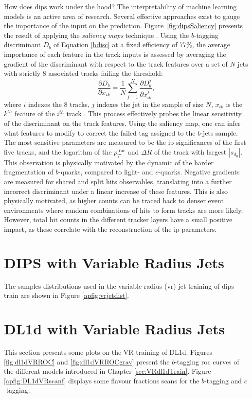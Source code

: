 How does \gls{dips} work under the hood? The interpretability of machine learning models is an active area of research. Several effective approaches exist to gauge the importance of the input on the prediction. Figure~\ref{fig:dipsSaliency} presents the result of applying the \textit{saliency maps} technique \cite{Simonyan2013DeepIC}. Using the $b$-tagging discriminant $D_b$ of Equation \ref{bdisc} at a fixed efficiency of 77\%, the average importance of each feature in the track inputs is assessed by averaging the gradient of the discriminant with respect to the track features over a set of $N$ jets with strictly 8 associated tracks failing the threshold:
\begin{equation}
  \frac{\partial D_b}{\partial x_{ik}} = \frac{1}{N} \sum_{j=1}^N \frac{\partial D_b^{j}}{\partial x_{ik}^{j}},
\end{equation} 
where $i$ indexes the 8 tracks, $j$ indexes the jet in the sample of size $N$, $x_{ik}$ is the $k^{th}$ feature of the $i^{th}$ track \cite{ATL-PHYS-PUB-2020-014}. This process effectively probes the linear sensitivity of the discriminant on the track features. Using the saliency map, one can infer what features to modify to correct the failed tag assigned to the $b$-jets sample. The most sensitive parameters are measured to be the \gls{ip} significances of the first five tracks, and the logarithm of the $p_T^{\textrm{frac}}$ and $\Delta R$ of the track with largest $|s_{d_0}|$. This observation is physically motivated by the dynamic of the harder fragmentation of $b$-quarks, compared to light- and $c$-quarks. Negative gradients are measured for shared and split hits observables, translating into a further incorrect discriminant under a linear increase of these features. This is also physically motivated, as higher counts can be traced back to denser event environments where random combinations of hits to form tracks are more likely. However, total hit counts in the different tracker layers have a small positive impact, as these correlate with the reconstruction of the \gls{ip} parameters.

\section{DIPS with Variable Radius Jets}\label{ap-DIPSVR}
The samples distributions used in the variable radius (\gls{vr}) jet training of \gls{dips} train are shown in Figure \ref{apfig:vrjetdist}.

\section{DL1d with Variable Radius Jets}\label{ap-DL1dVR}
This section presents some plots on the VR-training of DL1d. Figures \ref{fig:dl1dVRROC} and \ref{fig:dl1dVRROCgrav} present the $b$-tagging \gls{roc} curves of the different models introduced in Chapter \ref{sec:VRdl1dTrain}. Figure \ref{apfig:DL1dVRscanf} displays some flavour fractions scans for the $b$-tagging and $c$-tagging. 

